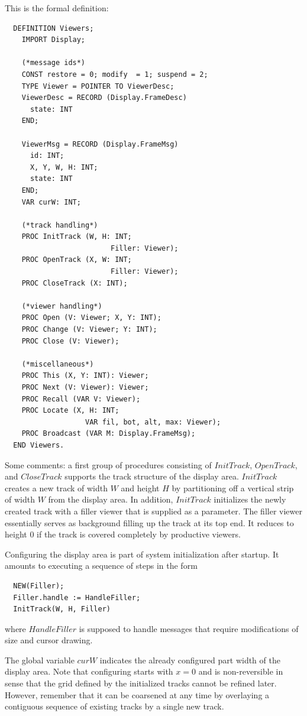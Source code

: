 This is the formal definition:
\begin{verbatim}
  DEFINITION Viewers;
    IMPORT Display;

    (*message ids*)
    CONST restore = 0; modify  = 1; suspend = 2;
    TYPE Viewer = POINTER TO ViewerDesc;
    ViewerDesc = RECORD (Display.FrameDesc)
      state: INT
    END;
  
    ViewerMsg = RECORD (Display.FrameMsg)
      id: INT;
      X, Y, W, H: INT;
      state: INT
    END;
    VAR curW: INT;

    (*track handling*)
    PROC InitTrack (W, H: INT;
                         Filler: Viewer);
    PROC OpenTrack (X, W: INT;
                         Filler: Viewer);
    PROC CloseTrack (X: INT);

    (*viewer handling*)
    PROC Open (V: Viewer; X, Y: INT);
    PROC Change (V: Viewer; Y: INT);
    PROC Close (V: Viewer);

    (*miscellaneous*)
    PROC This (X, Y: INT): Viewer;
    PROC Next (V: Viewer): Viewer;
    PROC Recall (VAR V: Viewer);
    PROC Locate (X, H: INT;
                   VAR fil, bot, alt, max: Viewer);
    PROC Broadcast (VAR M: Display.FrameMsg);
  END Viewers.
\end{verbatim}

Some comments: a first group of procedures consisting of $InitTrack$, $OpenTrack$, and $CloseTrack$
supports the track structure of the display area. $InitTrack$ creates a new track of width $W$ and
height $H$ by partitioning off a vertical strip of width $W$ from the display area. In addition, $InitTrack$
initializes the newly created track with a filler viewer that is supplied as a parameter. The filler
viewer essentially serves as background filling up the track at its top end. It reduces to height 0 if
the track is covered completely by productive viewers.

Configuring the display area is part of system initialization after startup. It amounts to executing a sequence of steps in the form
\begin{verbatim}
  NEW(Filler);
  Filler.handle := HandleFiller;
  InitTrack(W, H, Filler)
\end{verbatim}
where $HandleFiller$ is supposed to handle messages that require modifications of size and cursor
drawing.

The global variable $curW$ indicates the already configured part width of the display area.
Note that configuring starts with $x = 0$ and is non-reversible in sense that the grid defined by
the initialized tracks cannot be refined later. However, remember that it can be coarsened at any
time by overlaying a contiguous sequence of existing tracks by a single new track.

